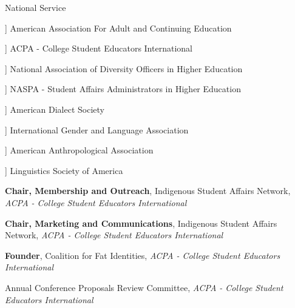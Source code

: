 \begin{rubric}{National Service}



    \entry*[2024 -- Present][\faIdCard[regular]]%
    American Association For Adult and Continuing Education
    
    \entry*[2015 -- 2023][\faIdCard[regular]]%
        ACPA - College Student Educators International	
        
    \entry*[2022 -- 2023][\faIdCard[regular]]%
    National Association of Diversity Officers in Higher Education
        
        \entry*[2015 -- 2017][\faIdCard[regular]]%
    NASPA - Student Affairs Administrators in Higher Education
    
        \entry*[2012 -- 2015][\faIdCard[regular]]%
    American Dialect Society
    
    \entry*[2012 -- 2015][\faIdCard[regular]]%
    International Gender and Language Association
    
        \entry*[2011 -- 2013][\faIdCard[regular]]%
    American Anthropological Association
    
        \entry*[2010 -- 2015][\faIdCard[regular]]%
    Linguistics Society of America
    
    
    
    \entry*[2022-2023][\faBullhorn] \textbf{Chair, Membership and Outreach}, Indigenous Student Affairs Network, \emph{ACPA - College Student Educators International}
    
    \entry*[2016-2022][\faBullhorn] \textbf{Chair, Marketing and Communications}, Indigenous Student Affairs Network, \emph{ACPA - College Student Educators International}
    
    \entry*[2020][\faBullhorn] \textbf{Founder}, Coalition for Fat Identities, \emph{ACPA - College Student Educators International}
    
    
    
    
    
    
    \entry*[2018-2022][\faUsers] Annual Conference Proposals Review Committee,  \emph{ACPA - College Student Educators International}
    
    
        
    \end{rubric}